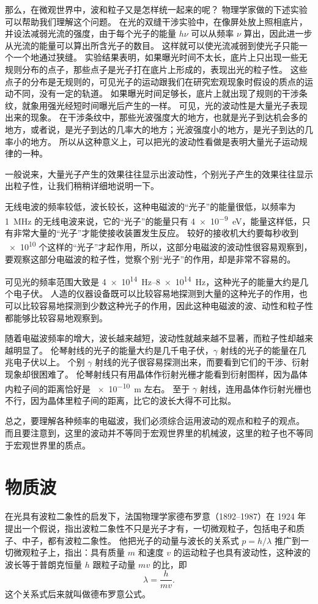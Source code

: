 那么，在微观世界中，波和粒子又是怎样统一起来的呢？
物理学家做的下述实验可以帮助我们理解这个问题。
在光的双缝干涉实验中，在像屏处放上照相底片，并设法减弱光流的强度，由于每个光子的能量 $h\nu$ 可以从频率 $\nu$ 算出，因此进一步从光流的能量可以算出所含光子的数目。
这样就可以使光流减弱到使光子只能一个一个地通过狭缝。
实验结果表明，如果曝光时间不太长，底片上只出现一些无规则分布的点子，那些点子是光子打在底片上形成的，表现出光的粒子性。
这些点子的分布是无规则的，可见光子的运动跟我们在研究宏观现象时假设的质点的运动不同，没有一定的轨道。
如果曝光时间足够长，底片上就出现了规则的干涉条纹，就象用强光经短时间曝光后产生的一样。
可见，光的波动性是大量光子表现出来的现象。
在干涉条纹中，那些光波强度大的地方，也就是光子到达机会多的地方，或者说，是光子到达的几率大的地方；光波强度小的地方，是光子到达的几率小的地方。
所以从这种意义上，可以把光的波动性看做是表明大量光子运动规律的一种。

一般说来，大量光子产生的效果往往显示出波动性，个别光子产生的效果往往显示出粒子性，让我们稍稍详细地说明一下。

无线电波的频率较低，波长较长，这种电磁波的“光子”的能量很低，以频率为 \qty{1}{MHz} 的无线电波来说，它的“光子”的能量只有 \qty{4e-9}{eV}，能量这样低，只有非常大量的“光子”才能使接收装置发生反应。
较好的接收机大约要每秒收到 \num{e10} 个这样的“光子”才起作用，所以，这部分电磁波的波动性很容易观察到，要观察这部分电磁波的粒子性，觉察个别“光子”的作用，却是非常不容易的。

可见光的频率范围大致是 \qtyrange{4e14}{8e14}{Hz}，这种光子的能量大约是几个电子伏。
人造的仪器设备既可以比较容易地探测到大量的这种光子的作用，也可以比较容易地探测到少数这种光子的作用，因此这种电磁波的波、动性和粒子性都能够比较容易地观察到。

随着电磁波频率的增大，波长越来越短，波动性就越来越不显著，而粒子性却越来越明显了。
伦琴射线的光子的能量大约是几千电子伏，$\gamma$ 射线的光子的能量在几兆电子伏以上。
个别 $\gamma$ 射线的光子很容易探测出来，而要看到它们的干涉、衍射现象却很困难了。
伦琴射线只有用晶体作衍射光栅才能看到衍射图样，因为晶体内粒子间的距离恰好是 \qty{e-10}{m} 左右。
至于 $\gamma$ 射线，连用晶体作衍射光栅也不行，因为晶体里粒子间的距离，比它的波长大得不可比拟。

总之，要理解各种频率的电磁波，我们必须综合运用波动的观点和粒子的观点。
而且要注意到，这里的波动并不等同于宏观世界里的机械波，这里的粒子也不等同于宏观世界里的质点。

\section{物质波}
在光具有波粒二象性的启发下，法国物理学家德布罗意（1892--1987）在 1924 年提出一个假说，指出波粒二象性不只是光子才有，一切微观粒子，包括电子和质子、中子，都有波粒二象性。
他把光子的动量与波长的关系式 $p=h/\lambda$ 推广到一切微观粒子上，指出：具有质量 $m$ 和速度 $v$ 的运动粒子也具有波动性，这种波的波长等于普朗克恒量 $h$ 跟粒子动量 $mv$ 的比，即
\[\lambda=\frac{h}{mv}.\]
这个关系式后来就叫做德布罗意公式。


